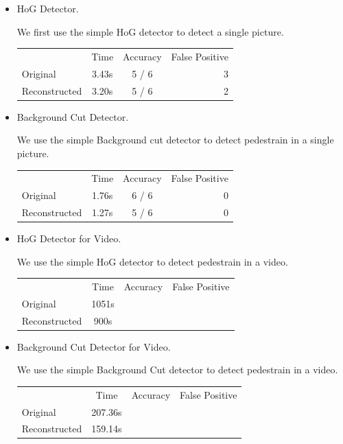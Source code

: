 \documentclass[a4paper]{article}
\begin{document}
\begin{enumerate}
\begin{itemize}
\item HoG Detector.

We first use the simple HoG detector to detect a single picture.
\begin{center}
\begin{tabular}{l | c | c | r}
\hline
                & Time  & Accuracy  & False Positive \\
Original        & 3.43s & 5 / 6     & 3              \\
Reconstructed   & 3.20s & 5 / 6     & 2              \\
\hline
\end{tabular}
\end{center}

\item Background Cut Detector.

We use the simple Background cut detector to detect pedestrain in a single picture.

\begin{center}
\begin{tabular}{l | c | c | r}
\hline
                & Time  & Accuracy  & False Positive \\
Original        & 1.76s & 6 / 6     & 0              \\
Reconstructed   & 1.27s & 5 / 6     & 0              \\
\hline
\end{tabular}
\end{center}

\item HoG Detector for Video.

We use the simple HoG detector to detect pedestrain in a video.

\begin{center}
\begin{tabular}{l | c | c | r}
\hline
                & Time  & Accuracy  & False Positive \\
Original        & 1051s  &           &                \\
Reconstructed   & 900s &           &                \\
\hline
\end{tabular}
\end{center}

\item Background Cut Detector for Video.

We use the simple Background Cut detector to detect pedestrain in a video.

\begin{center}
\begin{tabular}{l | c | c | r}
\hline
                & Time  & Accuracy  & False Positive \\
Original        & 207.36s  &           &                \\
Reconstructed   & 159.14s  &           &                \\
\hline
\end{tabular}
\end{center}

\end{itemize}

\end{enumerate}

\clearpage


\end{document}
